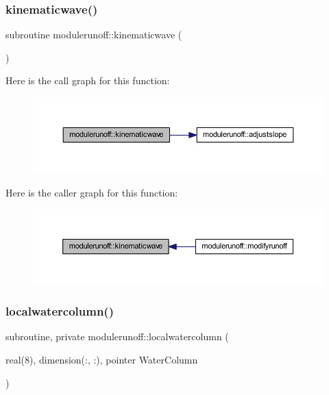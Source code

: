 \subsubsection{\texorpdfstring{kinematicwave()}{kinematicwave()}}
{\footnotesize\ttfamily subroutine modulerunoff\+::kinematicwave (\begin{DoxyParamCaption}{ }\end{DoxyParamCaption})\hspace{0.3cm}{\ttfamily [private]}}

Here is the call graph for this function\+:
\nopagebreak
\begin{figure}[H]
\begin{center}
\leavevmode
\includegraphics[width=350pt]{namespacemodulerunoff_ac9ce40d4e0d4a7a1faa6f0a7fd6eca2f_cgraph}
\end{center}
\end{figure}
Here is the caller graph for this function\+:
\nopagebreak
\begin{figure}[H]
\begin{center}
\leavevmode
\includegraphics[width=350pt]{namespacemodulerunoff_ac9ce40d4e0d4a7a1faa6f0a7fd6eca2f_icgraph}
\end{center}
\end{figure}
\mbox{\label{namespacemodulerunoff_abd7df3c244fbd0c4171c796df0f50906}} 
\subsubsection{\texorpdfstring{localwatercolumn()}{localwatercolumn()}}
{\footnotesize\ttfamily subroutine, private modulerunoff\+::localwatercolumn (\begin{DoxyParamCaption}\item[{real(8), dimension(\+:, \+:), pointer}]{Water\+Column }\end{DoxyParamCaption})\hspace{0.3cm}{\ttfamily [private]}}

